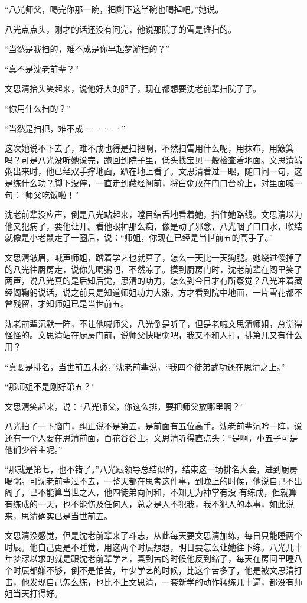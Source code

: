 “八光师父，喝完你那一碗，把剩下这半碗也喝掉吧。”她说。

八光点点头，刚才的话还没有问完，他说那院子的雪是谁扫的。

“当然是我扫的，难不成是你早起梦游扫的？”

“真不是沈老前辈？”

文思清抬头笑起来，说他好大的胆子，现在都想要沈老前辈扫院子了。

“你用什么扫的？”

“当然是扫把，难不成······”

这次她说不下去了，难不成也得是扫把啊，不然扫雪用什么呢，用抹布，用簸箕吗？可是八光没听她说完，跑回到院子里，低头找宝贝一般检查着地面。文思清端粥出来时，他已经双手撑地面，趴在地上看了。文思清看过一眼，随口问一句，这是练什么功？脚下没停，一直走到藏经阁前，将白粥放在门口台阶上，对里面喊一句：“师父吃饭啦！”

沈老前辈没应声，倒是八光站起来，瞠目结舌地看着她，挡住她路线。文思清以为他又犯病了，要他让开。看他眼神那么痴，像是动了邪念，八光咽了口口水，喉结就像是小老鼠走了一圈后，说：“师姐，你现在已经是当世前五的高手了。”

文思清皱眉，喊声师姐，蹭着学艺也就算了，怎么一天比一天狗腿。她绕过傻掉了的八光往厨房走，说你先喝粥吧，不然凉了。摸到厨房门时，沈老前辈在阁里笑了两声，说八光真的是后知后觉，思清的功力，怎么到今日才有所察觉？八光冲着藏经阁鞠躬说话，说之前只是知道师姐功力大涨，方才看到院中地面，一片雪花都不曾残留，才知师姐已是当世前五。

沈老前辈沉默一阵，不让他喊师父，八光倒是听了，但是老喊文思清师姐，总觉得怪怪的。文思清站在厨房门前，说师父快喝粥吧，我又不和人打，排第几又有什么用？

“真要是排名，当世前五未必，”沈老前辈说，“我四个徒弟武功还在思清之上。”

“那师姐不是刚好第五？”

文思清笑起来，说：“八光师父，你这么排，要把师父放哪里啊？”

八光拍了一下脑门，纠正说不是第五，是前面有五位高手。沈老前辈沉吟一阵，说还有一个人要在思清前面，百花谷谷主。文思清听得直点头：“是啊，小五子可是他们少谷主呢。”

“那就是第七，也不错了。”八光跟领导总结似的，结束这一场排名大会，进到厨房喝粥。可沈老前辈过不去，一整天都在思考这件事，到晚上的时候，他说自己不出阁了，已不能算当世之人，他四徒弟向问和，不知无为神掌有没
有练成，但就算有练成的一天，也不能伤及任何人，总之是人不犯我，我不犯人的本事，如此说来，思清确实已是当世前五。

文思清没感觉，但是沈老前辈来了斗志，从此每天要文思清加练，每日只能睡两个时辰。他自己更是不睡觉，用这两个时辰想想，明日要怎么让她往下练。八光几十年梦寐以求的就是跟沈老前辈学艺，真到苦的时候他反到缩了，每天在房间里睡八个时辰都嫌不够，倒不是怕苦，年少学艺的时候，比这个苦多了，他是被文思清打击，他发现自己怎么练，也比不上文思清，一套新学的动作猛练几十遍，都没有师姐当天打得好。

